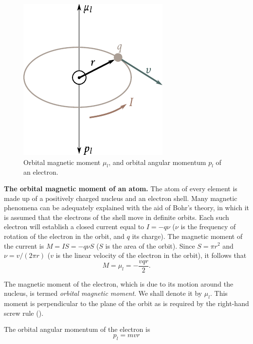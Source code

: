 \begin{figure}[t]
	\begin{center}
		\includegraphics[scale=1]{figures/ch_07/fig_7_9.pdf}
		\caption[]{Orbital magnetic moment $\mu_l$, and orbital angular momentum $p_l$ of an electron.}
		\label{fig:7_9}
	\end{center}
	\vspace{-0.7cm}
\end{figure}

\textbf{The orbital magnetic moment of an atom.} The atom of every element is made up of a positively charged nucleus and an electron shell. Many magnetic phenomena can be adequately explained with the aid of Bohr's theory, in which it is assumed that the electrons of the shell move in definite orbits. Each such electron will establish a closed current equal to $I=-q\nu$ ($\nu$ is the frequency of rotation of the electron in the orbit, and $q$ its charge). The magnetic moment of the current is $M=IS=-q\nu S$ ($S$ is the area of the orbit). Since $S=\pi r^2$ and $\nu=v/(2\pi r)$ ($v$ is the linear velocity of the electron in the orbit), it follows that
\begin{equation}\label{eq:7_14}
    M = \mu_l = - \frac{vqr}{2}.
\end{equation}

The magnetic moment of the electron, which is due to its motion around the nucleus, is termed \textit{orbital magnetic moment}. We shall denote it by $\mu_l$. This moment is perpendicular to the plane of the orbit as is required by the right-hand screw rule ().

The orbital angular momentum of the electron is
\begin{equation}\label{eq:7_15}
    p_l = mvr
\end{equation}

